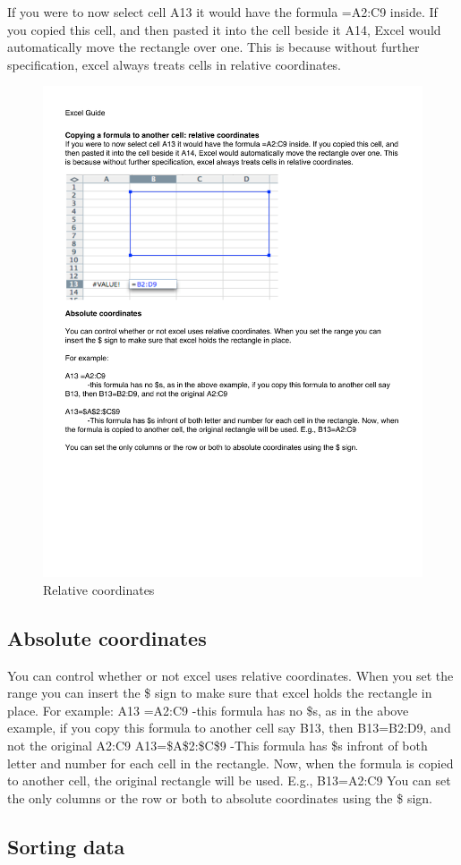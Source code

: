 If you were to now select cell A13 it would have the formula =A2:C9 inside. If you copied this cell, and then pasted it into the cell beside it A14, Excel would automatically move the rectangle over one. This is because without further specification, excel always treats cells in relative coordinates.

\begin{figure}
      \includegraphics[width=.5\linewidth]{LabmanualFigures/Excel10.pdf}
      \caption{Relative coordinates}
      \label{fig:excel10}
\end{figure}
 

\subsection{Absolute coordinates}
You can control whether or not excel uses relative coordinates. When you set the range you can insert the \$ sign to make sure that excel holds the rectangle in place.
For example:
A13 =A2:C9
-this formula has no \$s, as in the above example, if you copy this formula to another cell say
B13, then B13=B2:D9, and not the original A2:C9
A13=\$A\$2:\$C\$9
-This formula has \$s infront of both letter and number for each cell in the rectangle. Now, when
the formula is copied to another cell, the original rectangle will be used. E.g., B13=A2:C9 You can set the only columns or the row or both to absolute coordinates using the \$ sign.
 

\subsection{Sorting data}

